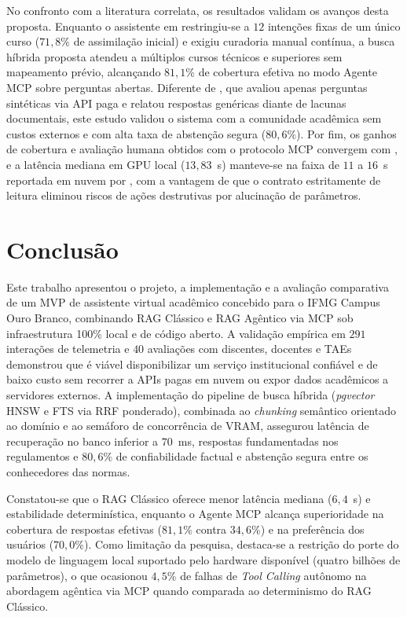 \documentclass[12pt]{article}
\begin{document}
No confronto com a literatura correlata, os resultados validam os avanços desta proposta. Enquanto o assistente em \cite{monteiro2021helena} restringiu-se a $12$ intenções fixas de um único curso ($71,8\%$ de assimilação inicial) e exigiu curadoria manual contínua, a busca híbrida proposta atendeu a múltiplos cursos técnicos e superiores sem mapeamento prévio, alcançando $81,1\%$ de cobertura efetiva no modo Agente MCP sobre perguntas abertas. Diferente de \cite{barbosa2023chatbot}, que avaliou apenas perguntas sintéticas via API paga e relatou respostas genéricas diante de lacunas documentais, este estudo validou o sistema com a comunidade acadêmica sem custos externos e com alta taxa de abstenção segura ($80,6\%$). Por fim, os ganhos de cobertura e avaliação humana obtidos com o protocolo MCP convergem com \cite{modran2025leveraging}, e a latência mediana em GPU local ($13,83$~s) manteve-se na faixa de $11$ a $16$~s reportada em nuvem por \cite{oliveira2025arquitetura}, com a vantagem de que o contrato estritamente de leitura eliminou riscos de ações destrutivas por alucinação de parâmetros.


\section{Conclusão}\label{sec:conclusao}

Este trabalho apresentou o projeto, a implementação e a avaliação comparativa de um MVP de assistente virtual acadêmico concebido para o IFMG Campus Ouro Branco, combinando RAG Clássico e RAG Agêntico via MCP sob infraestrutura 100\% local e de código aberto. A validação empírica em $291$ interações de telemetria e $40$ avaliações com discentes, docentes e TAEs demonstrou que é viável disponibilizar um serviço institucional confiável e de baixo custo sem recorrer a APIs pagas em nuvem ou expor dados acadêmicos a servidores externos. A implementação do pipeline de busca híbrida (\textit{pgvector} HNSW e FTS via RRF ponderado), combinada ao \textit{chunking} semântico orientado ao domínio e ao semáforo de concorrência de VRAM, assegurou latência de recuperação no banco inferior a $70$~ms, respostas fundamentadas nos regulamentos e $80,6\%$ de confiabilidade factual e abstenção segura entre os conhecedores das normas.

Constatou-se que o RAG Clássico oferece menor latência mediana ($6,4$~s) e estabilidade determinística, enquanto o Agente MCP alcança superioridade na cobertura de respostas efetivas ($81,1\%$ contra $34,6\%$) e na preferência dos usuários ($70,0\%$). Como limitação da pesquisa, destaca-se a restrição do porte do modelo de linguagem local suportado pelo hardware disponível (quatro bilhões de parâmetros), o que ocasionou $4,5\%$ de falhas de \textit{Tool Calling} autônomo na abordagem agêntica via MCP quando comparada ao determinismo do RAG Clássico.
\end{document}
